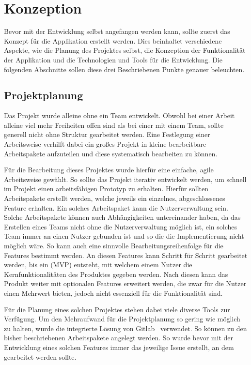 \chapter{Konzeption}

Bevor mit der Entwicklung selbst angefangen werden kann, sollte zuerst das
Konzept für die Applikation erstellt werden. Dies beinhaltet verschiedene
Aspekte, wie die Planung des Projektes selbst, die Konzeption der
Funktionalität der Applikation und die Technologien und Tools für die
Entwicklung. Die folgenden Abschnitte sollen diese drei Beschriebenen Punkte
genauer beleuchten.

\section{Projektplanung}

Das Projekt wurde alleine ohne ein Team entwickelt. Obwohl bei einer Arbeit
alleine viel mehr Freiheiten offen sind als bei einer mit einem Team, sollte
generell nicht ohne Struktur gearbeitet werden. Eine Festlegung einer
Arbeitsweise verhilft dabei ein großes Projekt in kleine bearbeitbare
Arbeitspakete aufzuteilen und diese systematisch bearbeiten zu können.

Für die Bearbeitung dieses Projektes wurde hierfür eine einfache, agile
Arbeitsweise gewählt. So sollte das Projekt iterativ entwickelt werden, um
schnell im Projekt einen arbeitsfähigen Prototyp zu erhalten. Hierfür sollten
Arbeitspakete erstellt werden, welche jeweils ein einzelnes, abgeschlossenes
Feature erhalten. Ein solches Arbeitspaket kann \zb{} die Nutzerverwaltung sein.
Solche Arbeitspakete können auch Abhängigkeiten untereinander haben, da \zb{}
das Erstellen eines Teams nicht ohne die Nutzerverwaltung möglich ist, ein solches
Team immer an einen Nutzer gebunden ist und so die die Implementierung nicht möglich wäre.
So kann auch eine sinnvolle Bearbeitungsreihenfolge für die
Features bestimmt werden. An diesen Features kann Schritt für Schritt
gearbeitet werden, bis ein  (MVP) entsteht, mit
welchem einem Nutzer die Kernfunktionalitäten des Produktes gegeben werden. Nach
diesen kann das Produkt weiter mit optionalen Features erweitert werden, die
zwar für die Nutzer einen Mehrwert bieten, jedoch nicht essenziell für die
Funktionalität sind.

Für die Planung eines solchen Projektes stehen dabei viele diverse Tools zur
Verfügung. Um den Mehraufwand für die Projektplanung so gering wie möglich zu
halten, wurde die integrierte Lösung von Gitlab~\cite{gitlab} verwendet. So
können zu den bisher beschriebenen Arbeitspakete \sog{}  angelegt
werden. So wurde bevor mit der Entwicklung eines solchen Features immer das
jeweilige Issue erstellt, an dem gearbeitet werden sollte.


